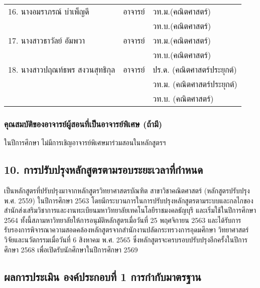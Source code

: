 {\begin{center}
{\begin{longtable}{|p{}|p{}|p{}|}
			
			16. นางอมราภรณ์ บำเพ็ญดี
			&อาจารย์
			&วท.ม.(คณิตศาสตร์)\\
			&&วท.บ.(คณิตศาสตร์)\\\hline
			
			
			17. นางสาวธาวัลย์ อัมพวา
			&	อาจารย์&วท.ม.(คณิตศาสตร์)\\
			&&วท.บ.(คณิตศาสตร์)\\\hline
			
			18. นางสาวปฤณท์ธพร สงวนสุทธิกุล 
			&อาจารย์&ปร.ด. (คณิตศาสตร์ประยุกต์)\\
			&&วท.ม. (คณิตศาสตร์ประยุกต์) \\
			&&วท.บ. (คณิตศาสตร์) \\\hline
	\end{longtable}}
\end{center} 

\printselfeval

\subsubsection*{คุณสมบัติของอาจารย์ผู้สอนที่เป็นอาจารย์พิเศษ (ถ้ามี)}

ในปีการศึกษา \printyear{} \printprogram{}ไม่มีการเชิญอาจารย์พิเศษมาร่วมสอนในหลักสูตรฯ

\printselfeval

\subsection*{10. การปรับปรุงหลักสูตรตามรอบระยะเวลาที่กำหนด}

\printprogram{} เป็นหลักสูตรที่ปรับปรุงมาจากหลักสูตรวิทยาศาสตรบัณฑิต สาขาวิชาคณิตศาสตร์ (หลักสูตรปรับปรุง พ.ศ. 2559) ในปีการศึกษา 2563 โดยมีกระบวนการในการปรับปรุงหลักสูตรตามระบบและกลไกของสำนักส่งเสริมวิชาการและงานทะเบียนมหาวิทยาลัยเทคโนโลยีราชมงคลธัญบุรี และเริ่มใช้ในปีการศึกษา 2564 ทั้งนี้สภามหาวิทยาลัยให้การอนุมัติหลักสูตรเมื่อวันที่ 25 พฤศจิกายน 2563 และได้รับการรับรองการพิจารณาความสอดคล้องหลักสูตรจากสำนักงานปลัดกระทรวงการอุดมศึกษา วิทยาศาสตร์ วิจัยและนวัตกรรมเมื่อวันที่ 6 สิงหาคม พ.ศ. 2565  ซึ่งหลักสูตรจะครบรอบปรับปรุงอีกครั้งในปีการศึกษา 2568 เพื่อเปิดรับนักศึกษาในปีการศึกษา 2569

\printselfeval

\subsection*{ผลการประเมิน องค์ประกอบที่ 1 การกำกับมาตรฐาน}


}

